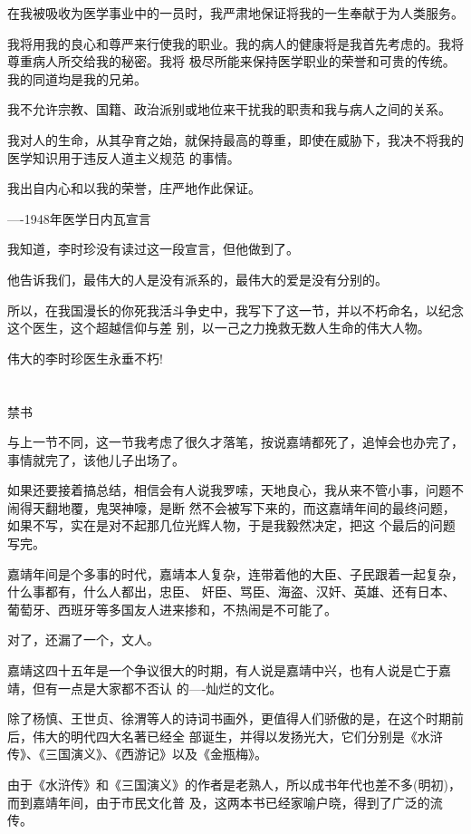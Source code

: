 \documentclass[11pt,a4paper,onecolumn]{article}
\begin{document}
在我被吸收为医学事业中的一员时，我严肃地保证将我的一生奉献于为人类服务。

我将用我的良心和尊严来行使我的职业。我的病人的健康将是我首先考虑的。我将尊重病人所交给我的秘密。我将
极尽所能来保持医学职业的荣誉和可贵的传统。我的同道均是我的兄弟。

我不允许宗教、国籍、政治派别或地位来干扰我的职责和我与病人之间的关系。

我对人的生命，从其孕育之始，就保持最高的尊重，即使在威胁下，我决不将我的医学知识用于违反人道主义规范
的事情。

我出自内心和以我的荣誉，庄严地作此保证。

----1948年医学日内瓦宣言

我知道，李时珍没有读过这一段宣言，但他做到了。

他告诉我们，最伟大的人是没有派系的，最伟大的爱是没有分别的。

所以，在我国漫长的你死我活斗争史中，我写下了这一节，并以不朽命名，以纪念这个医生，这个超越信仰与差
别，以一己之力挽救无数人生命的伟大人物。

伟大的李时珍医生永垂不朽!

\section[\thesection]{}

禁书

与上一节不同，这一节我考虑了很久才落笔，按说嘉靖都死了，追悼会也办完了，事情就完了，该他儿子出场了。

如果还要接着搞总结，相信会有人说我罗嗦，天地良心，我从来不管小事，问题不闹得天翻地覆，鬼哭神嚎，是断
然不会被写下来的，而这嘉靖年间的最终问题，如果不写，实在是对不起那几位光辉人物，于是我毅然决定，把这
个最后的问题写完。

嘉靖年间是个多事的时代，嘉靖本人复杂，连带着他的大臣、子民跟着一起复杂，什么事都有，什么人都出，忠臣、
奸臣、骂臣、海盗、汉奸、英雄、还有日本、葡萄牙、西班牙等多国友人进来掺和，不热闹是不可能了。

对了，还漏了一个，文人。

嘉靖这四十五年是一个争议很大的时期，有人说是嘉靖中兴，也有人说是亡于嘉靖，但有一点是大家都不否认
的----灿烂的文化。

除了杨慎、王世贞、徐渭等人的诗词书画外，更值得人们骄傲的是，在这个时期前后，伟大的明代四大名著已经全
部诞生，并得以发扬光大，它们分别是《水浒传》、《三国演义》、《西游记》以及《金瓶梅》。

由于《水浒传》和《三国演义》的作者是老熟人，所以成书年代也差不多(明初)，而到嘉靖年间，由于市民文化普
及，这两本书已经家喻户晓，得到了广泛的流传。
\end{document}
